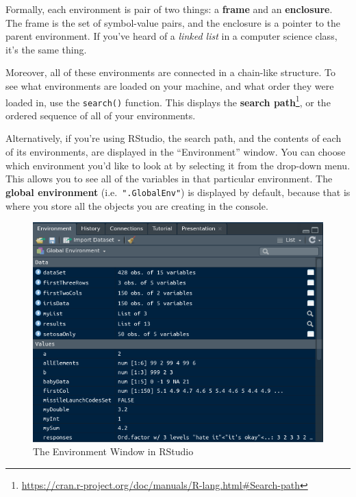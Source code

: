 \documentclass[
  12pt,
  krantz2]{krantz}
\renewcommand{\href}[2]{#2\footnote{\url{#1}}}
\newenvironment{rmd-details}{\begin{lrbox}{\rmdbox}
  \minipage[c]{\dimexpr \textwidth-2\fboxrule-\wd\bulb-\columnsep}
    \vspace*{\columnsep}}%
{\vspace*{\columnsep}\endminipage\end{lrbox}%
  {\par\color{green}\fboxsep=0pt
    \fbox{\usebox\bulb\usebox\rmdbox\hspace{\columnsep}}\par}}
\begin{document}
\begin{rmd-details}
Formally, each environment is pair of two things: a \textbf{frame} and an \textbf{enclosure}. The frame is the set of symbol-value pairs, and the enclosure is a pointer to the parent environment. If you've heard of a \emph{linked list} in a computer science class, it's the same thing.

\end{rmd-details}

Moreover, all of these environments are connected in a chain-like structure. To see what environments are loaded on your machine, and what order they were loaded in, use the \texttt{search()} function. This displays the \href{https://cran.r-project.org/doc/manuals/R-lang.html\#Search-path}{\textbf{search path}}, or the ordered sequence of all of your environments.

Alternatively, if you're using RStudio, the search path, and the contents of each of its environments, are displayed in the ``Environment'' window. You can choose which environment you'd like to look at by selecting it from the drop-down menu. This allows you to see all of the variables in that particular environment. The \textbf{global environment} (i.e.~\texttt{".GlobalEnv"}) is displayed by default, because that is where you store all the objects you are creating in the console.

\begin{figure}

{\centering \includegraphics[width=0.8\linewidth]{pics/environments_display_rstudio} 

}

\caption{The Environment Window in RStudio}\label{fig:rstudiodisp}
\end{figure}
\end{document}
